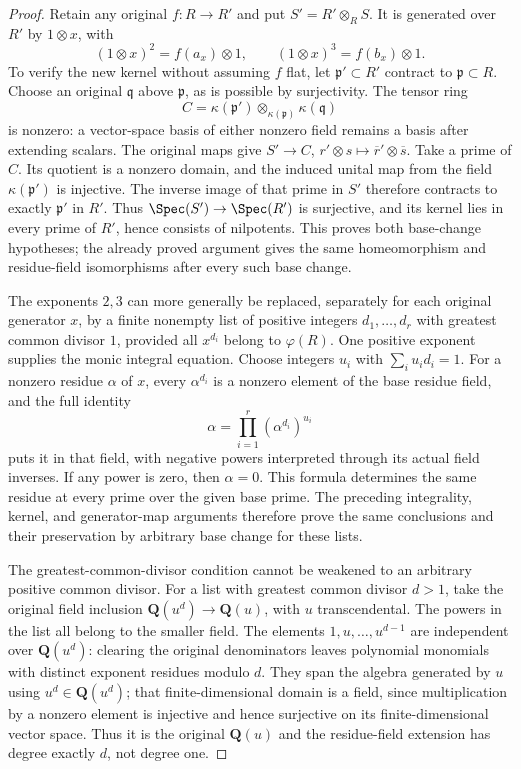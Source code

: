 \begin{proof}
Retain any original $f:R\to R'$ and put
$S'=R'\otimes_R S$. It is generated over
$R'$ by $1\otimes x$, with
$$
(1\otimes x)^2=f(a_x)\otimes1,
\qquad (1\otimes x)^3=f(b_x)\otimes1.
$$
To verify the new kernel without assuming
$f$ flat, let $\mathfrak p'\subset R'$
contract to $\mathfrak p\subset R$.
Choose an original $\mathfrak q$ above
$\mathfrak p$, as is possible by surjectivity.
The tensor ring
$$
C=\kappa(\mathfrak p')\otimes_{\kappa(\mathfrak p)}
\kappa(\mathfrak q)
$$
is nonzero: a vector-space basis of either
nonzero field remains a basis after extending
scalars. The original maps give
$S'\to C$, $r'\otimes s\mapsto\overline r'\otimes\overline s$.
Take a prime of $C$. Its quotient is a
nonzero domain, and the induced unital
map from the field $\kappa(\mathfrak p')$
is injective. The inverse image of that
prime in $S'$ therefore contracts to
exactly $\mathfrak p'$ in $R'$.
Thus $\Spec(S')\to\Spec(R')$ is surjective,
and its kernel lies in every prime of
$R'$, hence consists of nilpotents.
This proves both base-change hypotheses;
the already proved argument gives the
same homeomorphism and residue-field
isomorphisms after every such base change.

The exponents $2,3$ can more generally
be replaced, separately for each original
generator $x$, by a finite nonempty list
of positive integers $d_1,\ldots,d_r$
with greatest common divisor $1$, provided
all $x^{d_i}$ belong to $\varphi(R)$.
One positive exponent supplies the monic
integral equation. Choose integers $u_i$
with $\sum_i u_i d_i=1$. For a nonzero
residue $\alpha$ of $x$, every $\alpha^{d_i}$
is a nonzero element of the base residue
field, and the full identity
$$
\alpha=\prod_{i=1}^r(\alpha^{d_i})^{u_i}
$$
puts it in that field, with negative
powers interpreted through its actual
field inverses. If any power is zero,
then $\alpha=0$. This formula determines
the same residue at every prime over
the given base prime. The preceding
integrality, kernel, and generator-map
arguments therefore prove the same
conclusions and their preservation by
arbitrary base change for these lists.

The greatest-common-divisor condition
cannot be weakened to an arbitrary
positive common divisor. For a list
with greatest common divisor $d>1$,
take the original field inclusion
$\mathbf Q(u^d)\to\mathbf Q(u)$, with
$u$ transcendental. The powers in the
list all belong to the smaller field.
The elements $1,u,\ldots,u^{d-1}$ are
independent over $\mathbf Q(u^d)$:
clearing the original denominators
leaves polynomial monomials with
distinct exponent residues modulo $d$.
They span the algebra generated by $u$
using $u^d\in\mathbf Q(u^d)$; that
finite-dimensional domain is a field,
since multiplication by a nonzero
element is injective and hence
surjective on its finite-dimensional
vector space. Thus it is the original
$\mathbf Q(u)$ and the residue-field
extension has degree exactly $d$,
not degree one.


\end{proof}
